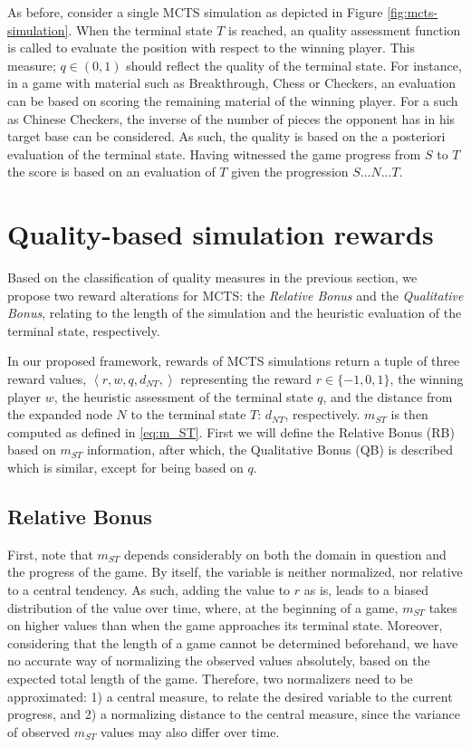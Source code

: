 \documentclass{ecai2010}
\newcommand{\tuple}[1]{\ensuremath{\left \langle #1 \right \rangle }}
\begin{document}
As before, consider a single MCTS simulation as depicted in Figure \ref{fig:mcts-simulation}. When the terminal state $T$ is reached, an quality assessment function is called to evaluate the position with respect to the winning player. This measure; $q \in (0, 1)$ should reflect the quality of the terminal state. For instance, in a game with material such as Breakthrough, Chess or Checkers, an evaluation can be based on scoring the remaining material of the winning player. For a such as Chinese Checkers, the inverse of the number of pieces the opponent has in his target base can be considered. As such, the quality is based on the a posteriori evaluation of the terminal state. Having witnessed the game progress from $S$ to $T$ the score is based on an evaluation of $T$ given the progression $S \ldots N \ldots T$.

\section{Quality-based simulation rewards}
\label{sec:qoreward}
Based on the classification of quality measures in the previous section, we propose two reward alterations for MCTS: the \emph{Relative Bonus} and the \emph{Qualitative Bonus}, relating to the length of the simulation and the heuristic evaluation of the terminal state, respectively. 

In our proposed framework, rewards of MCTS simulations return a tuple of three reward values, $\tuple{r, w, q, d_{NT},}$ representing the reward $r \in \{-1, 0, 1\}$, the winning player $w$, the heuristic assessment of the terminal state $q$, and the distance from the expanded node $N$ to the terminal state $T$: $d_{NT}$, respectively. $m_{ST}$ is then computed as defined in \ref{eq:m_ST}. First we will define the Relative Bonus (RB) based on $m_{ST}$ information, after which, the Qualitative Bonus (QB) is described which is similar, except for being based on $q$.

\subsection{Relative Bonus}
First, note that $m_{ST}$ depends considerably on both the domain in question and the progress of the game. By itself, the variable is neither normalized, nor relative to a central tendency. As such, adding the value to $r$ as is, leads to a biased distribution of the value over time, where, at the beginning of a game, $m_{ST}$ takes on higher values than when the game approaches its terminal state. Moreover, considering that the length of a game cannot be determined beforehand, we have no accurate way of normalizing the observed values absolutely, based on the expected total length of the game. Therefore, two normalizers need to be approximated: 1) a central measure, to relate the desired variable to the current progress, and 2) a normalizing distance to the central measure, since the variance of observed $m_{ST}$ values may also differ over time.
\end{document}
